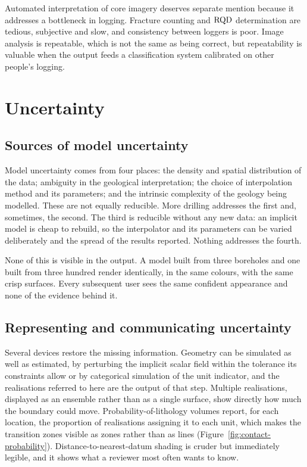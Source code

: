 Automated interpretation of core imagery deserves separate mention because it
addresses a bottleneck in logging. Fracture counting and $\mathrm{RQD}$ determination are
tedious, subjective and slow, and consistency between loggers is poor. Image
analysis is repeatable, which is not the same as being correct, but
repeatability is valuable when the output feeds a
classification system calibrated on other people's logging.

\section{Uncertainty}
\label{sec:model-uncertainty}

\subsection{Sources of model uncertainty}
\label{sec:model-uncertainty-sources}

Model uncertainty comes from four places: the density and spatial distribution
of the data; ambiguity in the geological interpretation; the choice of
interpolation method and its parameters; and the intrinsic complexity of the
geology being modelled. These are not equally reducible. More drilling
addresses the first and, sometimes, the second. The third is reducible without
any new data: an implicit model is cheap to rebuild, so the
interpolator and its parameters can be varied deliberately and the spread of
the results reported. Nothing addresses the fourth.

None of this is visible in the output. A model built from
three boreholes and one built from three hundred render identically, in the
same colours, with the same crisp surfaces. Every subsequent user sees the
same confident appearance and none of the evidence behind it.

\subsection{Representing and communicating uncertainty}
\label{sec:uncertainty-representation}

Several devices restore the missing information. Geometry can be simulated
as well as estimated, by perturbing the implicit scalar field within the
tolerance its constraints allow or by categorical simulation of the unit
indicator, and the realisations referred to here are the output of that
step. Multiple realisations,
displayed as an ensemble rather than as a single surface, show directly how
much the boundary could move. Probability-of-lithology volumes report, for
each location, the proportion of realisations assigning it to each unit,
which makes the transition zones visible as zones rather than as lines
(Figure~\ref{fig:contact-probability}).
Distance-to-nearest-datum shading is cruder but immediately legible, and it
shows what a reviewer most often wants to know.

